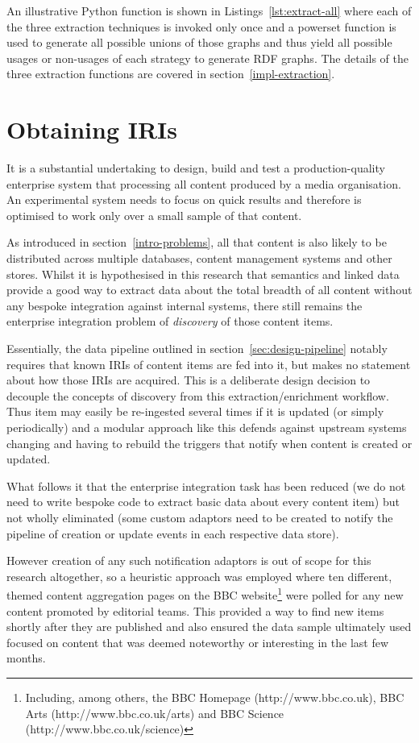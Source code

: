 An illustrative Python function is shown in
Listings~\ref{lst:extract-all} where each of the three extraction
techniques is invoked only once and a powerset function is used to
generate all possible unions of those graphs and thus yield all
possible usages or non-usages of each strategy to generate RDF
graphs. The details of the three extraction functions are covered in
section~\ref{impl-extraction}.

\section{Obtaining IRIs}

It is a substantial undertaking to design, build and test a
production-quality enterprise system that processing all content
produced by a media organisation. An experimental system needs to
focus on quick results and therefore is optimised to work only over
a small sample of that content.

As introduced in section~\ref{intro-problems}, all that content is
also likely to be distributed across multiple databases, content
management systems and other stores. Whilst it is hypothesised in
this research that semantics and linked data provide a good way to
extract data about the total breadth of all content without any
bespoke integration against internal systems, there still remains
the enterprise integration problem of \emph{discovery} of those
content items.

Essentially, the data pipeline outlined in
section~\ref{sec:design-pipeline} notably requires that known IRIs of
content items are fed into it, but makes no statement about how those
IRIs are acquired. This is a deliberate design decision to decouple
the concepts of discovery from this extraction/enrichment workflow.
Thus item may easily be re-ingested several times if it is updated
(or simply periodically) and
a modular approach like this defends against upstream systems changing
and having to rebuild the triggers that notify when content is created
or updated.

What follows it that the enterprise integration task has been reduced
(we do not need to write bespoke code to extract basic data about
every content item) but not wholly eliminated (some custom adaptors
need to be created to notify the pipeline of creation or update events
in each respective data store).

However creation of any such notification adaptors is out of scope
for this research altogether, so a heuristic approach was employed
where ten different, themed content aggregation pages on the BBC
website\footnote{
  Including, among others, the BBC Homepage (http://www.bbc.co.uk),
  BBC Arts (http://www.bbc.co.uk/arts) and BBC Science
  (http://www.bbc.co.uk/science)
} were polled for any new content promoted by editorial teams.
This provided a way to find new items shortly after they are published
and also ensured the data sample ultimately used focused on content
that was deemed noteworthy or interesting in the last few months.

